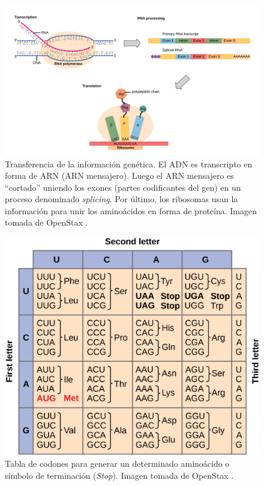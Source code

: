 \begin{figure}[H]
\centering
    \includegraphics[scale=0.35]{documents/latex/figures/1/dogma.png}
    \caption{Transferencia de la información genética. El ADN es transcripto en forma de ARN (ARN mensajero). Luego el ARN mensajero es ``cortado'' uniendo los exones (partes codificantes del gen) en un proceso denominado \textit{splicing}. Por último, los ribosomas usan la información para unir los aminoácidos en forma de proteína. Imagen tomada de OpenStax \cite{OpenStaxCNX}.}
    \label{fig:esquema_dogma}
\end{figure}


\begin{figure}[H]
\centering
    \includegraphics[scale=0.8]{documents/latex/figures/1/tableCodon.jpg}
    \caption{Tabla de codones para generar un determinado aminoácido o símbolo de terminación (\textit{Stop}). Imagen tomada de OpenStax \cite{OpenStaxCNX}.}
    \label{fig:table_codon}
\end{figure}

